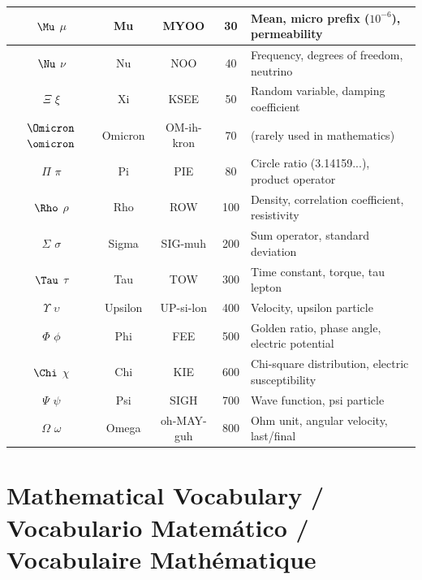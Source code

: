 \documentclass[12pt]{article}
\begin{document}
\begin{longtable}{|c|c|c|c|p{5cm}|}
\hline
$\Mu$ $\mu$ & Mu & MYOO & 30 & Mean, micro prefix ($10^{-6}$), permeability \\
\hline
$\Nu$ $\nu$ & Nu & NOO & 40 & Frequency, degrees of freedom, neutrino \\
\hline
$\Xi$ $\xi$ & Xi & KSEE & 50 & Random variable, damping coefficient \\
\hline
$\Omicron$ $\omicron$ & Omicron & OM-ih-kron & 70 & (rarely used in mathematics) \\
\hline
$\Pi$ $\pi$ & Pi & PIE & 80 & Circle ratio (3.14159...), product operator \\
\hline
$\Rho$ $\rho$ & Rho & ROW & 100 & Density, correlation coefficient, resistivity \\
\hline
$\Sigma$ $\sigma$ & Sigma & SIG-muh & 200 & Sum operator, standard deviation \\
\hline
$\Tau$ $\tau$ & Tau & TOW & 300 & Time constant, torque, tau lepton \\
\hline
$\Upsilon$ $\upsilon$ & Upsilon & UP-si-lon & 400 & Velocity, upsilon particle \\
\hline
$\Phi$ $\phi$ & Phi & FEE & 500 & Golden ratio, phase angle, electric potential \\
\hline
$\Chi$ $\chi$ & Chi & KIE & 600 & Chi-square distribution, electric susceptibility \\
\hline
$\Psi$ $\psi$ & Psi & SIGH & 700 & Wave function, psi particle \\
\hline
$\Omega$ $\omega$ & Omega & oh-MAY-guh & 800 & Ohm unit, angular velocity, last/final \\
\hline
\end{longtable}

\section{Mathematical Vocabulary / Vocabulario Matemático / Vocabulaire Mathématique}
\end{document}

